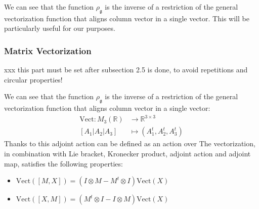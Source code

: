 
We can see that the function $\rho_{\mathfrak{g}}$ is the inverse of a restriction of the general vectorization function that aligns column vector in a single vector. This will be particularly useful for our purposes.



\subsubsection{Matrix Vectorization}\label{subse:vectorization}

\noindent
xxx this part must be set after subsection 2.5 is done, to avoid repetitions and circular properties!

\noindent
We can see that the function $\rho_{\mathfrak{g}}$ is the inverse of a restriction of the general vectorization function that aligns column vector in a single vector:
\begin{align*}
\text{Vect} : M_{3}(\mathbb{R}) & \longrightarrow \mathbb{R}^{3\times 3}  \\
[A_1 \big| A_2  \big| A_3]
&\longmapsto  
(A_1^{t}, A_2^{t} , A_3^{t})
\end{align*}
Thanks to this adjoint action can be defined as an action over 
The vectorization, in combination with Lie bracket, Kronecker product, adjoint action and adjoint map, satisfies the following properties:
\begin{itemize}
	\item $\text{Vect} ([M,X]) =  (I\otimes M - M^{t}\otimes I)\text{Vect} (X) $
	\item $\text{Vect} ([X,M]) = (M^{t}\otimes I - I\otimes M)\text{Vect} (X) $
\end{itemize}

